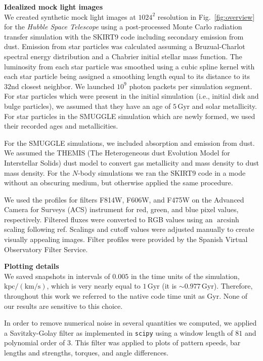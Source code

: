 \documentclass[twoside]{natureprintstyle}
\DeclareMathOperator\arcsinh{arcsinh}
\newcommand{\Nbody}{$N$-body}
\begin{document}
\vspace{12pt}

\noindent
{\bf Idealized mock light images}
\\
\noindent
We created synthetic mock light images at $1024^2$ resolution in
Fig.~\ref{fig:overview} for the \textit{Hubble Space Telescope} using a
post-processed Monte Carlo radiation transfer simulation with the SKIRT9 code
including secondary emission from dust.\cite{2020AC....3100381C} Emission from
star particles was calculated assuming a Bruzual-Charlot spectral energy
distribution\cite{2003MNRAS.344.1000B} and a Chabrier initial stellar mass
function\cite{2003PASP..115..763C}. The luminosity from each star particle was
smoothed using a cubic spline kernel with each star particle being assigned a
smoothing length equal to its distance to its $32$nd closest neighbor. We
launched $10^9$ photon packets per simulation segment. For star particles
which were present in the initial simulation (i.e., initial disk and bulge
particles), we assumed that they have an age of $5\,\textrm{Gyr}$ and solar
metallicity. For star particles in the SMUGGLE simulation which are newly
formed, we used their recorded ages and metallicities.

For the SMUGGLE simulations, we included absorption and emission from dust. We
assumed the THEMIS (The Heterogeneous dust Evolution Model for Interstellar
Solids) dust model\cite{2017AA...602A..46J} to convert gas metallicity and
mass density to dust mass density. For the \Nbody{} simulations we ran the
SKIRT9 code in a mode without an obscuring medium, but otherwise applied the
same procedure.

We used the profiles for filters F814W, F606W, and F475W on the Advanced
Camera for Surveys (ACS) instrument for red, green, and blue pixel values,
respectively. Filtered fluxes were converted to RGB values using an $\arcsinh$
scaling following ref.\cite{2004PASP..116..133L} Scalings and cutoff values
were adjusted manually to create visually appealing images. Filter profiles
were provided by the Spanish Virtual Observatory Filter
Service.\cite{2012ivoa.rept.1015R, 2020sea..confE.182R}

\vspace{12pt}

\noindent
{\bf Plotting details}
\\
\noindent
We saved snapshots in intervals of $0.005$ in the time units of the
simulation, $\textrm{kpc}/(\textrm{km}/\textrm{s})$, which is very nearly
equal to $1\,\textrm{Gyr}$ (it is $\sim0.977\,\textrm{Gyr}$). Therefore,
throughout this work we referred to the native code time unit as
$\textrm{Gyr}$. None of our results are sensitive to this choice.

In order to remove numerical noise in several quantities we computed, we
applied a Savitzky-Golay filter\cite{1964AnaCh..36.1627S} as implemented in
\texttt{scipy} using a window length of $81$ and polynomial order of $3$. This
filter was applied to plots of pattern speeds, bar lengths and strengths,
torques, and angle differences.

% 
\end{document}
